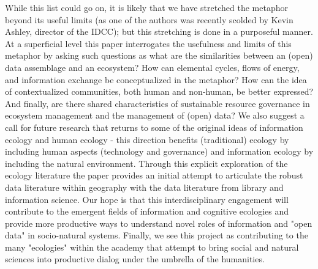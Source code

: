 While this list could go on, it is likely that we have stretched the metaphor beyond its useful limits (as one of the authors was recently scolded by Kevin Ashley, director of the IDCC); but this stretching is done in a purposeful manner. At a superficial level this paper interrogates the usefulness and limits of this metaphor by asking such questions as what are the similarities between an (open) data assemblage and an ecosystem? How can elemental cycles, flows of energy, and information exchange be conceptualized in the metaphor? How can the idea of contextualized communities, both human and non-human, be better expressed? And finally, are there shared characteristics of sustainable resource governance in ecosystem management and the management of (open) data? We also suggest a call for future research that returns to some of the original ideas of information ecology and human ecology - this direction benefits (traditional) ecology by including human aspects (technology and governance) and information ecology by including the natural environment. Through this explicit exploration of the ecology literature the paper provides an initial attempt to articulate the robust data literature within geography with the data literature from library and information science. Our hope is that this interdisciplinary engagement will contribute to the emergent fields of information and cognitive ecologies and provide more productive ways to understand novel roles of information and "open data" in socio-natural systems. Finally, we see this project as contributing to the many "ecologies" within the academy that attempt to bring social and natural sciences into productive dialog under the umbrella of the humanities.

